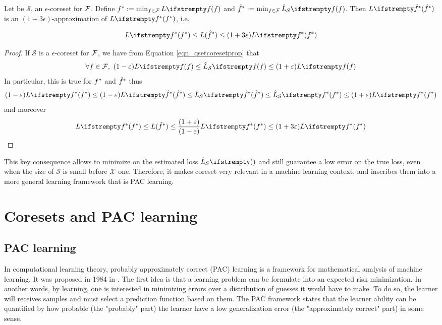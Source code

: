 \begin{theorem}
    Let be $\mathcal{S}$, an $\epsilon$-coreset for $\mathcal{F}$. Define $\query^*:=\min_{\query \in \qset}\loss{\query}$ and $\hat \query^*:=\min_{\query \in \qset}\estloss{\mathcal{S}}{\query}$. Then $\loss{\hat\query^*} $ is an $(1+3\epsilon)$-approximation of $\loss{\query^*}$, i.e.

    \begin{equation*}
        \loss{\query^*} \le {L}( \hat\query^*)\leq (1+ 3 \epsilon)\loss{\query^*}
    \end{equation*}
    \label{thm_optcoreset}
\end{theorem}
\begin{proof}
    If $\mathcal{S}$ is a $\epsilon$-coreset for $\mathcal{F}$, we have from Equation \ref{eqn_qsetcoresetprop} that 
    \begin{equation*}
        \forall \query \in \qset ,\ (1-\epsilon) \loss{\query} \le \estloss{\mathcal{S}}{\query} \le(1+\epsilon) \loss{\query}
    \end{equation*}
    In particular, this is true for $f^*$ and $\hat {f}^*$ thus
    \begin{equation}
        (1-\epsilon) \loss{\query^*} \le(1-\epsilon) \loss{\hat\query^*} \le \estloss{\mathcal{S}}{\hat\query^*} \le \estloss{\mathcal{S}}{\query^*} \le(1+\epsilon) \loss{\query^*}
    \end{equation}
    and moreover
    \begin{equation*}
        \loss{\query^*} \le {L}( \hat\query^*) \le \frac{(1+\epsilon)}{(1-\epsilon) } \loss{\query^*} \leq (1+ 3 \epsilon)\loss{\query^*}
        \end{equation*}
\end{proof}
This key consequence allows to minimize on the estimated loss $\estloss{\mathcal{S}}{}$ and still guarantee a low error on the true loss, even when the size of $\mathcal{S}$ is small before $\mathcal{X}$ one. Therefore, it makes coreset very relevant in a machine learning context, and  inscribes them into a more general learning framework that is PAC learning.

\section{Coresets and PAC learning}
\subsection{PAC learning}In computational learning theory, probably approximately correct (PAC) learning is a framework for mathematical analysis of machine learning. It was proposed in 1984 in \cite{valiant1984learnable}. The first idea is that a learning problem can be formulate into an expected risk minimization. In another words, by learning, one is interested in minimizing errors over a distribution of guesses it would have to make. To do so, the learner will receives samples and must select a prediction function based on them. The PAC framework states that the learner ability can be quantified by how probable (the "probably" part) the learner have a low generalization error (the "approximately correct" part) in some sense.



